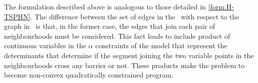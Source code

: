 \documentclass[a4paper,  review, authoryear, 1p.]{elsarticle}
\newcommand{\TSPHN}{{\sf{H-TSPHN}\xspace }}
\newcommand{\TSPN}{{\sf{H-TSPN}\xspace }}
\newcommand{\CV}[1]{{\color{red}#1}}
\begin{document}
		The formulation described above is analogous to those detailed in \eqref{form:H-TSPHN}.
		The difference between the set of edges in the \TSPN \ with respect to the graph in \TSPHN \ is that, in the former case, the edges that join each pair of neighbourhoods must be considered. This fact leads to include product of continuous variables in the $\alpha$ constraints of the model that represent the determinants that determine if the segment joining the two variable points in the neighbourhoods cross any barrier or not. These products make the problem to become \CV{non-convex quadratically constrained program.}


		
		
		
\end{document}
